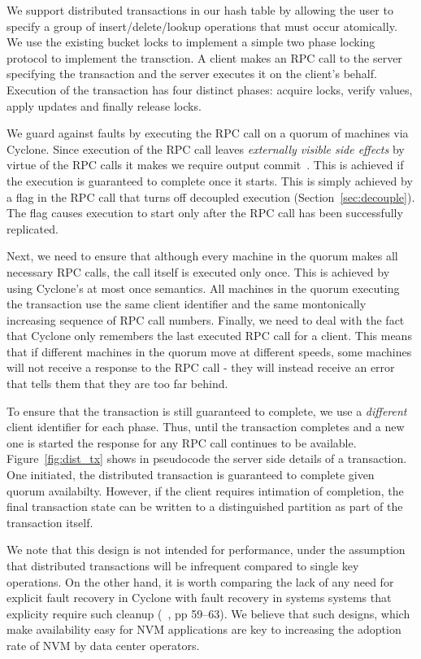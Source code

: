 \documentclass[letterpaper,twocolumn,10pt]{article}
\begin{document}
We support distributed transactions in our hash table by allowing the user to
specify a group of insert/delete/lookup operations that must occur
atomically. We use the existing bucket locks to implement a simple two phase
locking protocol to implement the transction. A client makes an RPC call to the
server specifying the transaction and the server executes it on the client's
behalf. Execution of the transaction has four distinct phases: acquire locks,
verify values, apply updates and finally release locks.

We guard against faults by executing the RPC call on a quorum of machines via
Cyclone. Since execution of the RPC call leaves \emph{externally visible side
  effects} by virtue of the RPC calls it makes we require output
commit~\cite{output_commit}. This is achieved if the execution is guaranteed to
complete once it starts. This is simply achieved by a flag in the RPC call that
turns off decoupled execution (Section~\ref{sec:decouple}). The flag causes
execution to start only after the RPC call has been successfully replicated.

Next, we need to ensure that although every machine in the quorum makes all
necessary RPC calls, the call itself is executed only once. This is achieved by
using Cyclone's at most once semantics. All machines in the quorum executing the
transaction use the same client identifier and the same montonically increasing
sequence of RPC call numbers. Finally, we need to deal with the fact that
Cyclone only remembers the last executed RPC call for a client. This means that
if different machines in the quorum move at different speeds, some machines will
not receive a response to the RPC call - they will instead receive an error that
tells them that they are too far behind.

To ensure that the transaction is still guaranteed to complete, we use a
\emph{different} client identifier for each phase. Thus, until the transaction
completes and a new one is started the response for any RPC call continues to be
available. Figure~\ref{fig:dist_tx} shows in pseudocode the server side details
of a transaction. One initiated, the distributed transaction is guaranteed to
complete given quorum availabilty. However, if the client requires intimation of
completion, the final transaction state can be written to a distinguished
partition as part of the transaction itself.

We note that this design is not intended for performance, under the assumption
that distributed transactions will be infrequent compared to single key
operations.  On the other hand, it is worth comparing the lack of any need for
explicit fault recovery in Cyclone with fault recovery in systems systems that
explicity require such cleanup (~\cite{farm}, pp 59--63).  We believe that
such designs, which make availability easy for NVM applications are key to
increasing the adoption rate of NVM by data center operators.
\end{document}
